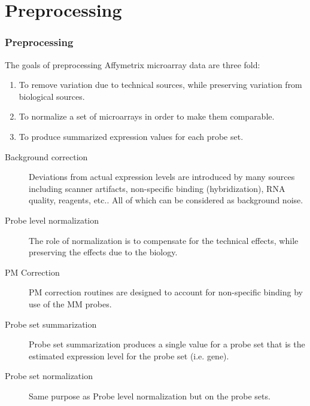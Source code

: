 \documentclass[pdf]{beamer}
\begin{document}
\section{Preprocessing}
\begin{frame}
  \frametitle{Preprocessing}
  The goals of preprocessing Affymetrix microarray data are three fold:
  \begin{enumerate}
    \item To remove variation due to technical sources, while preserving variation from biological sources. 
    \item To normalize a set of microarrays in order to make them comparable.
    \item To produce summarized expression values for each probe set.
  \end{enumerate} 
\end{frame}

\begin{frame}
  \begin{description}
    \item[Background correction] Deviations from actual expression levels are introduced by many sources including scanner artifacts, non-specific binding (hybridization), RNA quality, reagents, etc.. All of which can be considered as background noise.
    \item[Probe level normalization] The role of normalization is to compensate for the technical effects, while preserving the effects due to the biology.
    \item[PM Correction] PM correction routines are designed to account for non-specific binding by use of the MM probes.
    \item[Probe set summarization] Probe set summarization produces a single value for a probe set that is the estimated expression level for the probe set (i.e. gene).
    \item[Probe set normalization] Same purpose as Probe level normalization but on the probe sets.
  \end{description}
\end{frame}
\end{document}
